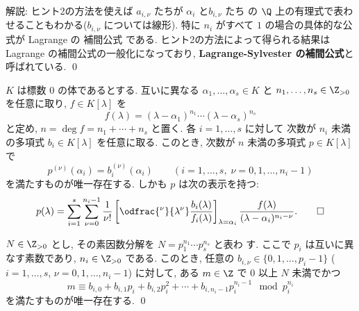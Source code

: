 \documentclass[12pt,twoside]{jarticle}
\begin{document}
\medskip
\noindent
解説: ヒント2の方法を使えば $a_{i,\nu}$ たちが $\alpha_i$ と$b_{i,\nu}$ たち
の $\Q$ 上の有理式で表わせることもわかる($b_{i,\nu}$ については線形).  
特に $n_i$ がすべて $1$ の場合の具体的な公式が Lagrange の
補間公式  である.  
ヒント2の方法によって得られる結果は Lagrange の補間公式の一般化になっており,
{\bf Lagrange-Sylvester の補間公式}と呼ばれている. 
\qed

\begin{theorem}
\label{theorem:Lagrange-Sylvester}
  $K$ は標数 $0$ の体であるとする.
  互いに異なる $\alpha_1,\dots,\alpha_s\in K$ 
  と $n_1,\dots,n_s\in\Z_{>0}$ を任意に取り, $f\in K[\lambda]$ を
  \begin{equation*}
    f(\lambda) = (\lambda-\alpha_1)^{n_1}\cdots(\lambda-\alpha_s)^{n_s}
  \end{equation*}
  と定め, $n=\deg f =n_1+\cdots+n_s$ と置く.
  各 $i=1,\dots,s$ に対して
  次数が $n_i$ 未満の多項式 $b_i\in K[\lambda]$ を任意に取る.
  このとき, 次数が $n$ 未満の多項式 $p\in K[\lambda]$ で
  \begin{equation*}
    p^{(\nu)}(\alpha_i) = b_i^{(\nu)}(\alpha_i)
    \qquad (i=1,\dots,s,\; \nu=0,1,\dots,n_i-1)
  \end{equation*}
  を満たすものが唯一存在する. しかも $p$ は次の表示を持つ:
  \begin{equation*}
    p(\lambda) = 
    \sum_{i=1}^s 
    \sum_{\nu=0}^{n_i-1}
    \frac{1}{\nu !}
    \left[
      \odfrac{^\nu}{\lambda^\nu}
      \frac{b_i(\lambda)}{f_i(\lambda)}
    \right]_{\lambda=\alpha_i}
    \frac{f(\lambda)}{(\lambda-\alpha_i)^{n_i-\nu}}.
    \qed
  \end{equation*}
\end{theorem}


\begin{question}
\label{q:Lagrange-interpolation-4-Z}
  $N\in \Z_{>0}$ とし, その素因数分解を $N=p_1^{n_1}\cdots p_s^{n_s}$ と表わ
  す.  ここで $p_i$ は互いに異なす素数であり, $n_i\in\Z_{>0}$ である.
  このとき, 任意の $b_{i,\nu}\in\{0,1,\dots,p_i-1\}$ 
  ($i=1,\dots,s$, $\nu=0,1,\dots,n_i-1$) に対して,
  ある $m\in\Z$ で $0$ 以上 $N$ 未満でかつ
  \begin{equation*}
    m \equiv 
    b_{i,0} + b_{i,1} p_i + b_{i,2} p_i^2 + \cdots + b_{i,n_i-1} p_i^{n_i-1}
    \mod{p_i^{n_i}}
  \end{equation*}
  を満たすものが唯一存在する. \qed
\end{question}
\end{document}
